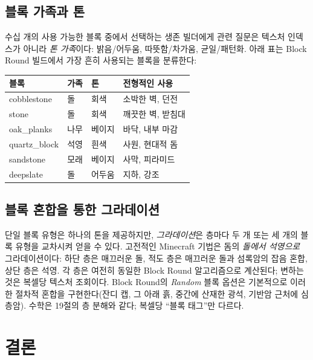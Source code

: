 \documentclass[12pt,a4paper]{scrartcl}
\begin{document}
\subsection{블록 가족과 톤}
수십 개의 사용 가능한 블록 중에서 선택하는 생존 빌더에게 관련 질문은 텍스처 인덱스가 아니라 \emph{톤 가족}이다: 밝음/어두움, 따뜻함/차가움, 균일/패턴화. 아래 표는 Block Round 빌드에서 가장 흔히 사용되는 블록을 분류한다:

\vspace{0.4em}
\begin{center}
\begin{tabular}{@{}llll@{}}
\toprule
\textbf{블록} & \textbf{가족} & \textbf{톤} & \textbf{전형적인 사용} \\
\midrule
cobblestone        & 돌  & 회색  & 소박한 벽, 던전 \\
stone              & 돌  & 회색  & 깨끗한 벽, 받침대 \\
oak\_planks        & 나무   & 베이지   & 바닥, 내부 마감 \\
quartz\_block      & 석영    & 흰색   & 사원, 현대적 돔 \\
sandstone          & 모래   & 베이지   & 사막, 피라미드 \\
deepslate          & 돌  & 어두움  & 지하, 강조 \\
\bottomrule
\end{tabular}
\end{center}

\subsection{블록 혼합을 통한 그라데이션}
단일 블록 유형은 하나의 톤을 제공하지만, \emph{그라데이션}은 층마다 두 개 또는 세 개의 블록 유형을 교차시켜 얻을 수 있다. 고전적인 Minecraft 기법은 돔의 \emph{돌에서 석영으로} 그라데이션이다: 하단 층은 매끄러운 돌, 적도 층은 매끄러운 돌과 섬록암의 잡음 혼합, 상단 층은 석영. 각 층은 여전히 동일한 Block Round 알고리즘으로 계산된다; 변하는 것은 복셀당 텍스처 조회이다. Block Round의 \emph{Random} 블록 옵션은 기본적으로 이러한 절차적 혼합을 구현한다(잔디 캡, 그 아래 흙, 중간에 산재한 광석, 기반암 근처에 심층암). 수학은 19절의 층 분해와 같다; 복셀당 \enquote{블록 태그}만 다르다.

\section{결론}
\end{document}
